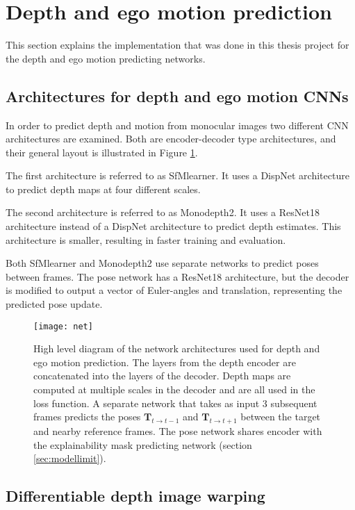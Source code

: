 \section{Depth and ego motion prediction}

This section explains the implementation that was done in this thesis project for the depth and ego motion predicting networks.

\subsection{Architectures for depth and ego motion CNNs}

In order to predict depth and motion from monocular images two different CNN architectures are examined. Both are encoder-decoder type architectures, and their general layout is illustrated in Figure \ref{fig:net}.

The first architecture is referred to as SfMlearner\cite{sfmlearner}. It uses a DispNet\cite{dispnet} architecture to predict depth maps at four different scales.

The second architecture is referred to as Monodepth2\cite{monodepth2}. It uses a ResNet18 architecture instead of a DispNet architecture to predict depth estimates. This architecture is smaller, resulting in faster training and evaluation.

Both SfMlearner and Monodepth2 use separate networks to predict poses between frames. The pose network has a ResNet18\cite{resnet} architecture, but the decoder is modified to output a vector of Euler-angles and translation, representing the predicted pose update.

\begin{figure}[H]
	\centering
	\texttt{[image: net]}
	\caption{High level diagram of the network architectures used for depth and ego motion prediction. The layers from the depth encoder are concatenated into the layers of the decoder. Depth maps are computed at multiple scales in the decoder and are all used in the loss function. A separate network that takes as input 3 subsequent frames predicts the poses $\textbf{T}_{t\rightarrow t-1}$ and $\textbf{T}_{t\rightarrow t+1}$ between the target and nearby reference frames. The pose network shares encoder with the explainability mask predicting network (section \ref{sec:modellimit}).}
	\label{fig:net}
\end{figure}

\subsection{Differentiable depth image warping}
\label{sec:diffwarp}

